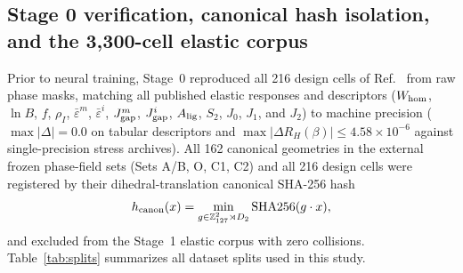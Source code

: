 \documentclass[preprint,11pt,a4paper]{elsarticle}
\begin{document}
\subsection{Stage 0 verification, canonical hash isolation, and the 3,300-cell elastic corpus}
\label{sec:data}

Prior to neural training, Stage~0 reproduced all 216 design cells of Ref.~\cite{GomezOvalle2026} from raw phase masks, matching all published elastic responses and descriptors ($W_{\rm hom}$, $\ln B$, $f$, $\rho_I$, $\bar\varepsilon^m$, $\bar\varepsilon^i$, $J_{\rm gap}^m$, $J_{\rm gap}^i$, $A_{\rm lig}$, $S_2$, $J_0$, $J_1$, and $J_2$) to machine precision ($\max|\Delta|=0.0$ on tabular descriptors and $\max|\Delta R_H(\beta)|\le 4.58\times 10^{-6}$ against single-precision stress archives). All 162 canonical geometries in the external frozen phase-field sets (Sets A/B, O, C1, C2) and all 216 design cells were registered by their dihedral-translation canonical SHA-256 hash
\begin{equation}
h_{\rm canon}(x) = \min_{g\in\mathbb Z_{127}^2\rtimes D_2}\operatorname{SHA256}(g\cdot x),
\end{equation}
and excluded from the Stage~1 elastic corpus with zero collisions. Table~\ref{tab:splits} summarizes all dataset splits used in this study.
\end{document}
